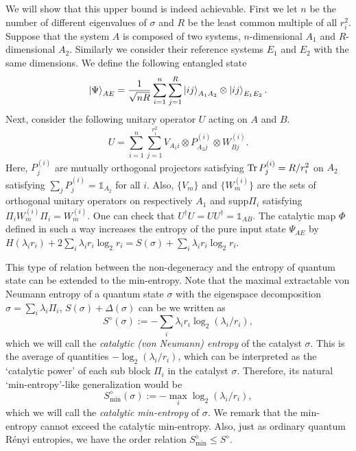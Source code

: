 \documentclass[aps, reprint, amsmath,amssymb, prx, superscriptaddress]{revtex4-2}
\begin{document}
\begin{proofEnd}
    We will show that this upper bound is indeed achievable. First we let $n$ be the number of different eigenvalues of $\sigma$ and $R$ be the least common multiple of all $r_i^2$. Suppose that the system $A$ is composed of two systems, $n$-dimensional $A_1$ and $R$-dimensional $A_2$. Similarly we consider their reference systems $E_1$ and $E_2$ with the same dimensions. We define the following entangled state
    $$\ket{\Psi}_{AE}=\frac{1}{\sqrt{nR}}\sum_{i=1}^n\sum_{j=1}^{R}\ket{ij}_{A_1A_2}\otimes \ket{ij}_{E_1E_2}.$$
    Next, consider the following unitary operator $U$ acting on $A$ and $B$.
    \begin{equation}
        U=\sum_{i=1}^n \sum_{j=1}^{r_i^2} V_{A_1i} \otimes P_{A_2j}^{(i)}  \otimes W_{Bj}^{(i)}.
    \end{equation}
    Here, $P_j^{(i)}$ are mutually orthogonal projectors satisfying $\Tr P_j^{(i)} = R/r_i^2$ on $A_2$ satisfying $\sum_j P_j^{(i)} = \mathds{1}_{A_2}$ for all $i$. Also, $\{V_m\}$ and $\{W_m^{(i)}\}$ are the sets of orthogonal unitary operators on respectively $A_1$ and supp$\Pi_i$ satisfying $\Pi_i W_m^{(i)} \Pi_i = W_m^{(i)}$. One can check that $U^\dag U = U U^\dag = \mathds{1}_{AB}$. The catalytic map $\Phi$ defined in such a way increases the entropy of the pure input state $\Psi_{AE}$ by $H(\lambda_i r_i) + 2\sum_i \lambda_i r_i \log_2  r_i=S(\sigma) + \sum_i \lambda_i r_i \log_2  r_i$.
\end{proofEnd}
This type of relation between the non-degeneracy and the entropy of quantum state can be extended to the min-entropy. Note that the maximal extractable von Neumann entropy of a quantum state $\sigma$ with the eigenspace decomposition $\sigma=\sum_i \lambda_i \Pi_i$, $S(\sigma)+\Delta(\sigma)$ can be we written as 
\begin{equation}
   S^\diamond(\sigma):= -\sum_i \lambda_i r_i \log_2  (\lambda_i/r_i),
\end{equation}
which we will call the \textit{catalytic (von Neumann) entropy} of the catalyst $\sigma$.  This is the average of quantities $-\log_2  (\lambda_i/r_i)$, which can be interpreted as the `catalytic power' of each sub block $\Pi_i$ in the catalyst $\sigma$. Therefore, its natural `min-entropy'-like generalization would be 
\begin{equation}
    S_{\min{}}^{\diamond}(\sigma):=-\max_i \log_2  (\lambda_i/r_i),
\end{equation}
which we will call the \textit{catalytic min-entropy} of $\sigma$. We remark that the min-entropy cannot exceed the catalytic min-entropy. Also, just as ordinary quantum R\'{e}nyi entropies, we have the order relation $S_{\min{}}^\diamond\leq S^\diamond.$
\end{document}
